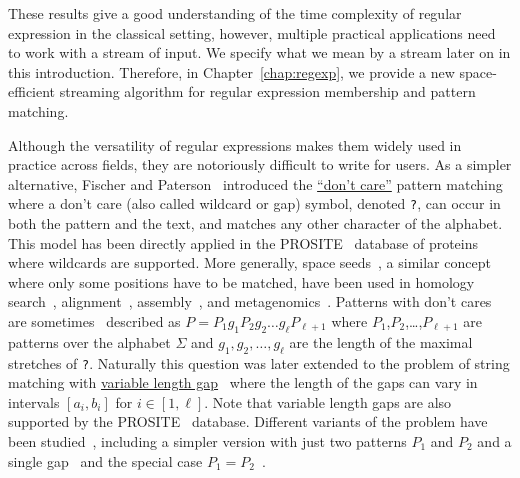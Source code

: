 These results give a good understanding of the time complexity of regular expression in the classical setting, however, multiple practical applications need to work with a stream of input. We specify what we mean by a stream later on in this introduction. Therefore, in Chapter~\ref{chap:regexp}, we provide a new space-efficient streaming algorithm for regular expression membership and pattern matching.


Although the versatility of regular expressions makes them widely used in practice across fields, they are notoriously difficult to write for users.
As a simpler alternative, Fischer and Paterson~\cite{FischerPaterson} introduced the \underline{``don't care''} pattern matching where a don't care (also called wildcard or gap) symbol, denoted \texttt{?}, can occur in both the pattern and the text, and matches any other character of the alphabet.
This model has been directly applied in the PROSITE~\cite{hulo2006prosite} database of proteins where wildcards are supported. More generally, space seeds~\cite{li2004patternhunter}, a similar concept where only some positions have to be matched, have been used in homology search~\cite{ma2002patternhunter}, alignment~\cite{david2011shrimp2}, assembly~\cite{birol2015spaced}, and metagenomics~\cite{bvrinda2015spaced}.
Patterns with don't cares are sometimes~\cite{lewenstein2011indexing} described as $P= P_1g_1P_2g_2 \dots g_\ell P_{\ell+1}$ where $P_1$,$P_2$,\dots,$P_{\ell+1}$ are patterns over the alphabet $\Sigma$ and $g_1,g_2,\dots,g_{\ell}$ are the length of the maximal stretches of \texttt{?}. 
Naturally this question was later extended to the problem of string matching with \underline{variable length gap}~\cite{bille2012string,bille2014string} where the length of the gaps can vary in intervals $[a_i,b_i]$ for $i\in[1,\ell]$.
Note that variable length gaps are also supported by the PROSITE~\cite{hulo2006prosite} database.
Different variants of the problem have been studied~\cite{kopelowitz2016color,cohen2009range,brodal1999finding}, including a simpler version with just two patterns $P_1$ and $P_2$ and a single gap~\cite{peterlongo2006gapped,iliopoulos2009indexing} and the special case $P_1=P_2$~\cite{muthukrishnan2002efficient,keller2007range}.

